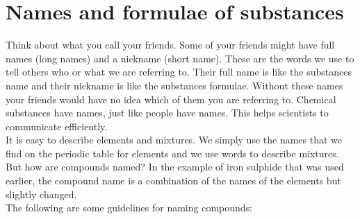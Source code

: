             \section{Names and formulae of substances}
            \nopagebreak
      \label{m38708*eip-379}Think about what you call your friends. Some of your friends might have full names (long names) and a nickname (short name). These are the words we use to tell others who or what we are referring to. Their full name is like the substances name and their nickname is like the substances formulae. Without these names your friends would have no idea which of them you are referring to. Chemical substances have names, just like people have names. This helps scientists to communicate efficiently. \\
\label{m38708*id64028}It is easy to describe elements and mixtures. We simply use the names that we find on the periodic table for elements and we use words to describe mixtures. But how are compounds named? In the example of iron sulphide that was used earlier, the compound name is a combination of the names of the elements but slightly changed.\\
      \label{m38708*id64033}The following are some guidelines for naming compounds: 
